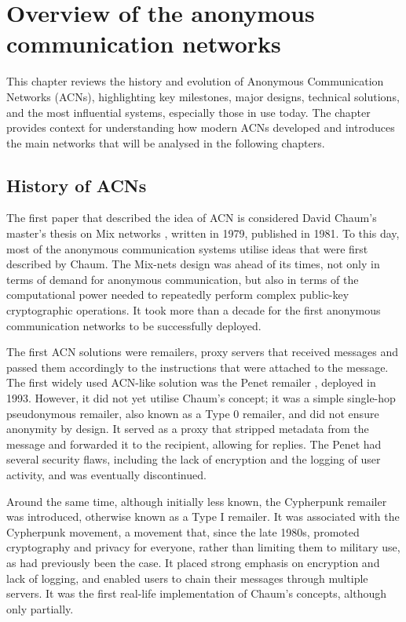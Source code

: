 \chapter{Overview of the anonymous communication networks }

This chapter reviews the history and evolution of Anonymous Communication Networks (ACNs), highlighting key milestones, major designs, technical solutions, and the most influential systems, especially those in use today. The chapter provides context for understanding how modern ACNs developed and introduces the main networks that will be analysed in the following chapters.

\section{History of ACNs}
The first paper that described the idea of ACN is considered David Chaum's master's thesis on Mix networks \cite{Chaum81}, written in 1979, published in 1981. To this day, most of the anonymous communication systems utilise ideas that were first described by Chaum. The Mix-nets design was ahead of its times, not only in terms of demand for anonymous communication, but also in terms of the computational power needed to repeatedly perform complex public-key cryptographic operations. It took more than a decade for the first anonymous communication networks to be successfully deployed.

The first ACN solutions were remailers, proxy servers that received messages and passed them accordingly to the instructions that were attached to the message.
The first widely used ACN-like solution was the Penet remailer \cite{penet}, deployed in 1993. However, it did not yet utilise Chaum’s concept; it was a simple single-hop pseudonymous remailer, also known as a Type 0 remailer, and did not ensure anonymity by design. It served as a proxy that stripped metadata from the message and forwarded it to the recipient, allowing for replies. The Penet had several security flaws, including the lack of encryption and the logging of user activity, and was eventually discontinued.

Around the same time, although initially less known, the Cypherpunk remailer was introduced, otherwise known as a Type I remailer. It was associated with the Cypherpunk movement, a movement that, since the late 1980s, promoted cryptography and privacy for everyone, rather than limiting them to military use, as had previously been the case. It placed strong emphasis on encryption and lack of logging, and enabled users to chain their messages through multiple servers. It was the first real-life implementation of Chaum’s concepts, although only partially.

